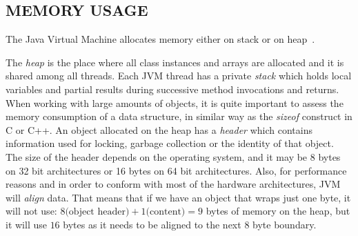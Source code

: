 \documentclass[a4paper,twoside]{article}
\begin{document}
%



\subsection{\uppercase{Memory Usage}}\label{subsec:uppercase12}

The Java Virtual Machine allocates memory either on stack or on heap~\cite{lindholm:2014}.

The {\textit{heap} } is the place where all class instances and arrays are allocated and it is shared among all threads.
Each JVM thread has a private {\textit{stack} } which holds local variables and partial results  during successive method invocations and returns.
When working with large amounts of objects, it is quite important to assess the memory consumption of a data structure, in similar way as the {\textit{sizeof} } construct in C or C++.
An object allocated on the heap has a {\textit{header} } which contains information used for locking, garbage collection or the identity of that object.
The size of the header depends on the operating system, and it may be 8 bytes on 32 bit architectures or 16 bytes on 64 bit architectures.
Also, for performance reasons and in order to conform with most of the hardware architectures, JVM will {\textit{align} } data.
That means that if we have an object that wraps just one byte, it will not use: $8 \text{(object header)} + 1 \text{(content)} = 9 $ bytes of memory on the heap, but it will use $16$ bytes as it needs to be aligned to the next $8$ byte boundary.
\end{document}
